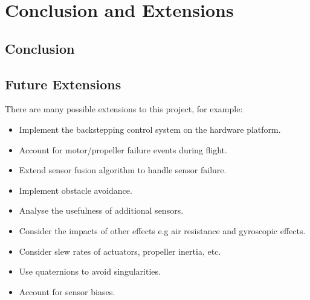 
\chapter{Conclusion and Extensions}

\section{Conclusion}

\section{Future Extensions}
There are many possible extensions to this project, for example:

\begin{itemize}
\item Implement the backstepping control system on the hardware platform.\\
\item Account for motor/propeller failure events during flight.\\
\item Extend sensor fusion algorithm to handle sensor failure.\\
\item Implement obstacle avoidance.\\
\item Analyse the usefulness of additional sensors.\\
\item Consider the impacts of other effects e.g air resistance and gyroscopic effects.\\
\item Consider slew rates of actuators, propeller inertia, etc.\\
\item Use quaternions to avoid singularities.\\
\item Account for sensor biases.


\end{itemize}

\clearpage


